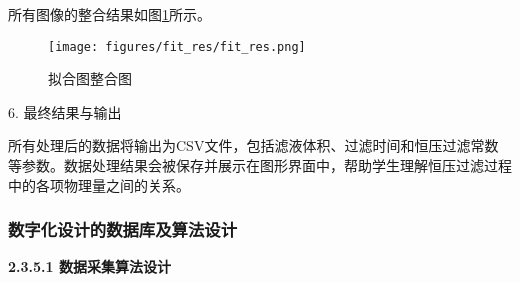 所有图像的整合结果如图\ref{fig:fit_res_intergrated}所示。

\begin{figure}[H]
    \centering
    \texttt{[image: figures/fit\_res/fit\_res.png]}
    \caption{拟合图整合图}
    \label{fig:fit_res_intergrated}
\end{figure}

\pagebreak{}

6. 最终结果与输出

所有处理后的数据将输出为CSV文件，包括滤液体积、过滤时间和恒压过滤常数等参数。数据处理结果会被保存并展示在图形界面中，帮助学生理解恒压过滤过程中的各项物理量之间的关系。

\subsubsection{数字化设计的数据库及算法设计}

{\noindent \wuhao \rmfamily {} \textbf{2.3.5.1 \quad 数据采集算法设计}}

